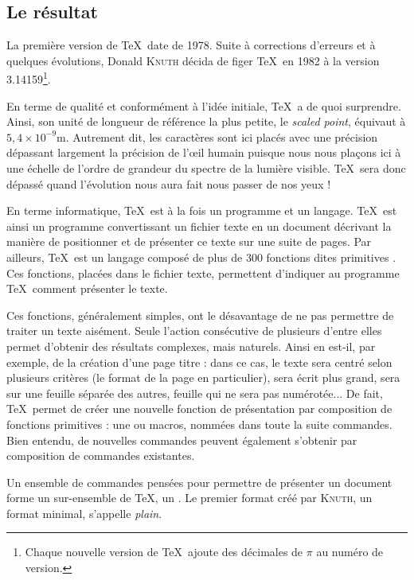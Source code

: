 \subsection{Le résultat}

La première version de \TeX\ date de 1978. Suite à corrections d'erreurs et à quelques évolutions, Donald \textsc{Knuth} décida de figer \TeX\ en 1982 à la version 3.14159\footnote{Chaque nouvelle version de \TeX\ ajoute des décimales de $\pi$ au numéro de version.}. 

En terme de qualité et conformément à l'idée initiale, \TeX\ a de quoi surprendre. Ainsi, son unité de longueur de référence la plus petite, le \emph{scaled point}, équivaut à $5,4\times10^{-9}$m. Autrement dit, les caractères sont ici placés avec une précision dépassant largement la précision de l'\oe il humain puisque nous nous plaçons ici à une échelle de l'ordre de grandeur du spectre de la lumière visible. \TeX\ sera donc dépassé quand l'évolution nous aura fait nous passer de nos yeux !

En terme informatique, \TeX\ est à la fois un programme et un langage. \TeX\ est ainsi un programme convertissant un fichier texte en un document décrivant la manière de positionner et de présenter ce texte sur une suite de pages. Par ailleurs, \TeX\ est un langage composé de plus de 300 fonctions dites \og primitives \fg{}. Ces fonctions, placées dans le fichier texte, permettent d'indiquer au programme \TeX\ comment présenter le texte. 

Ces fonctions, généralement simples, ont le désavantage de ne pas permettre de traiter un texte aisément. Seule l'action consécutive de plusieurs d'entre elles permet d'obtenir des résultats complexes, mais naturels. Ainsi en est-il, par exemple, de la création d'une page titre : dans ce cas, le texte sera centré selon plusieurs critères (le format de la page en particulier), sera écrit plus grand, sera sur une feuille séparée des autres, feuille qui ne sera pas numérotée... De fait, \TeX\ permet de créer une nouvelle fonction de présentation par composition de fonctions primitives : une  ou macros, nommées dans toute la suite commandes. Bien entendu, de nouvelles commandes peuvent également s'obtenir par composition de commandes existantes.

Un ensemble de commandes pensées pour permettre de présenter un document forme un sur-ensemble de \TeX, un . Le premier format créé par \textsc{Knuth}, un format minimal, s'appelle \emph{plain}.  


